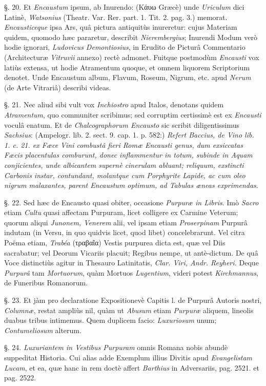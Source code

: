 \documentclass[a4paper, 11pt, oneside, polutonikogreek, german]{article}
\begin{document}
§. 20. Et \emph{Encaustum} ipsum, ab Inurendo: (Κάυω Græcè) unde \emph{Uriculum} dici Latinè, \emph{Watsonius} (Theatr. Var. Rer. part. 1. Tit. 2. pag. 3.) memorat. \emph{Encausticeque} ipsa Ars, quâ pictura antiquitùs inureretur: cujus Materiam quidem, quomodo hæc pararetur, describit \emph{Nierembergius}; Inurendi Modum verò hodie ignorari, \emph{Ludovicus Demontiosius}, in Erudito de Picturâ Commentario (Architecturæ \emph{Vitruvii} annexo) rectè admonet. Fuitque postmodùm \emph{Encausti} vox latiùs extensa, ut hodie Atramentum quoque, et omnem liquorem Scriptorium denotet. Unde Encaustum album, Flavum, Roseum, Nigrum, etc. apud \emph{Nerum} (de Arte Vitrariâ) describi videas.

§. 21. Nec aliud sibi vult vox \emph{Inchiostro} apud Italos, denotans quidem \emph{Atramentum}, quo communiter scribimus; sed corruptim certissimè est ex \emph{Encausti} voculâ enatum. Et de \emph{Chalcographorum Encausto} sic scribit diligentissimus \emph{Sachsius}: (Ampelogr. lib. 2. sect. 9. cap. 1. p. 582:) \emph{Refert Baccius, de Vino lib. 1. c. 21. ex Fæce Vini combustâ fieri Romæ Encausti genus, dum exsiccatas Fæcis placentulas comburunt, donec inflammentur in totum, subinde in Aquam conjicientes, unde albicantem supernè cinerulam abluant; reliquum, exstincti Carbonis instar, contundant, molantque cum Porphyrite Lapide, ac cum oleo nigrum malaxantes, parent Encaustum optimum, ad Tabulas æneas exprimendas}.

§. 22. Sed hæc de Encausto quasi obiter, occasione \emph{Purpuræ in Libris}. Imò \emph{Sacro} etiam \emph{Cultu} quasi affectam Purpuram, licet colligere ex Carmine Veterum; quorum aliqui \emph{Junonem, Venerem} alii, vel ipsam etiam \emph{Proserpinam} Purpurâ indutam (in Versu, in quo quidvis licet, quod libet) concelebrarunt. Vel citra Poëma etiam, \emph{Trabéa} (τραβαῖα) Vestis purpurea dicta est, quæ vel Diis sacrabatur; vel Deorum Vicariis placuit; Regibus nempe, ut antè-dictum. De quâ Voce distinctiùs agitur in Thesauro Latinitatis, \emph{Clar. Viri, Andr. Reyheri.} Deque \emph{Purpurâ} tam \emph{Mortuorum}, quàm Mortuos \emph{Lugentium}, videri potest \emph{Kirchmannus}, de Funeribus Romanorum.

§. 23. Et jàm pro declaratione Expositionevè Capitis l. de Purpurâ Autoris nostri, \emph{Columnæ}, restat ampliùs nil, quàm ut \emph{Abusum} etiam \emph{Purpuræ} aliquem, lineolis duabus tribus intimemus. Quem duplicem facio: \emph{Luxuriosum} unum; \emph{Contumeliosum} alterum.

§. 24. \emph{Luxuriantem in Vestibus Purpuram} omnis Romana nobis abundè suppeditat Historia. Cui alias adde Exemplum illius Divitis apud \emph{Evangelistam Lucam}, et ea, quæ hanc in rem doctè affert \emph{Barthius} in Adversariis, pag. 2521. et pag. 2522.
\end{document}
